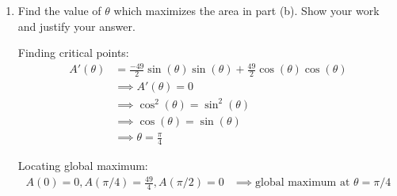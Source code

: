 \documentclass{ximera}
\begin{document}
\begin{problem}
\begin{enumerate}
    \item
      Find the value of $\theta$ which maximizes the area in part (b).
      Show your work and justify your answer.
      \begin{explanation}
        Finding critical points:
        \begin{align*}
          A'(\theta) &= \frac{-49}{2} \sin(\theta)\sin(\theta) + \frac{49}{2}\cos(\theta)\cos(\theta) \\
          &\implies A'(\theta) = 0\\
          &\implies \cos^2(\theta) = \sin^2(\theta)\\
          &\implies \cos(\theta) = \sin(\theta)\\
          &\implies \theta = \frac{\pi}{4}
        \end{align*}

        Locating global maximum:
        \begin{align*}
          A(0) = 0, A(\pi/4) = \frac{49}{4}, A(\pi/2) = 0 &\implies \mbox{global maximum at $\theta = \pi/4$}
        \end{align*}
      \end{explanation}
  \end{enumerate}
\end{problem}
\end{document}
